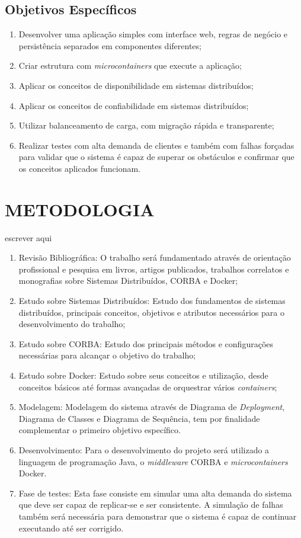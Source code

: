 \subsection{Objetivos Específicos} 
\begin{enumerate}[label=\alph*]
	\item Desenvolver uma aplicação simples com interface web, regras de negócio e persistência separados em componentes diferentes;
	\item Criar estrutura com \textit{microcontainers} que execute a aplicação;
	\item Aplicar os conceitos de disponibilidade em sistemas distribuídos;
	\item Aplicar os conceitos de confiabilidade em sistemas distribuídos;
	\item Utilizar balanceamento de carga, com migração rápida e transparente;
	\item Realizar testes com alta demanda de clientes e também com falhas forçadas para validar que o sistema é capaz de superar os obstáculos e confirmar que os conceitos aplicados funcionam.
\end{enumerate}

\section{METODOLOGIA}
	escrever aqui

\begin{enumerate}
	\item Revisão Bibliográfica: O trabalho será fundamentado através de orientação profissional e pesquisa em livros, artigos publicados, trabalhos correlatos e monografias sobre Sistemas Distribuídos, CORBA e Docker;
	\item Estudo sobre Sistemas Distribuídos: Estudo dos fundamentos de sistemas distribuídos, principais conceitos, objetivos e atributos necessários para o desenvolvimento do trabalho;
	\item Estudo sobre CORBA: Estudo dos principais métodos e configurações necessárias para alcançar o objetivo do trabalho;
	\item Estudo sobre Docker: Estudo sobre seus conceitos e utilização, desde conceitos básicos até formas avançadas de orquestrar vários \textit{containers};
	\item Modelagem: Modelagem do sistema através de Diagrama de \textit{Deployment}, Diagrama de Classes e Diagrama de Sequência, tem por finalidade complementar o primeiro objetivo específico.
	\item Desenvolvimento: Para o desenvolvimento do projeto será utilizado a linguagem de programação Java, o \textit{middleware} CORBA e \textit{microcontainers} Docker.
	\item Fase de testes: Esta fase consiste em simular uma alta demanda do sistema que deve ser capaz de replicar-se e ser consistente. A simulação de falhas também será necessária para demonstrar que o sistema é capaz de continuar executando até ser corrigido.
\end{enumerate}